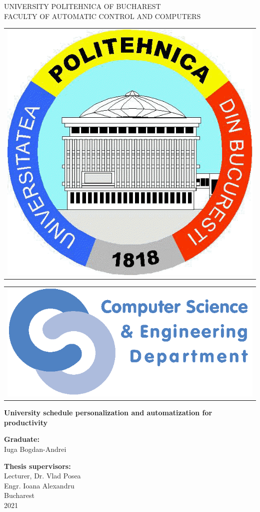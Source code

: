 \thispagestyle{empty}
\begin{center}
\large
UNIVERSITY POLITEHNICA OF BUCHAREST \\
FACULTY OF AUTOMATIC CONTROL AND COMPUTERS \\

\begin{tabular}[t]{@{}l}
	\includegraphics[scale=0.16]{figures/logos/upb.png}
\end{tabular}
\hfill
\begin{tabular}[t]{l@{}}
	\includegraphics[scale=0.3]{figures/logos/cse.png}
\end{tabular}
\vfill\noindent

{\LARGE
	\textbf{University schedule personalization and automatization for productivity}
}

\vspace{3cm}
\textbf{Graduate:}\\
Iuga Bogdan-Andrei

\bigskip
\bigskip

\textbf{Thesis supervisors:}\\
Lecturer, Dr. Vlad Posea \\
Engr. Ioana Alexandru\\

Bucharest \\
2021 \\
\vspace*{1cm}
\end{center}
